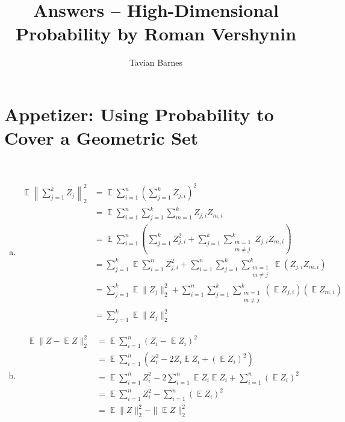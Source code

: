 \documentclass{report}
\title{Answers -- High-Dimensional Probability \linebreak[1] by Roman Vershynin}
\author{Tavian Barnes}
\date{}
\theoremstyle{definition}
\newenvironment{exercise}[1]{
  \renewcommand\theexerciseimpl{#1}
  \exerciseimpl
}{\endexerciseimpl}
\DeclareMathOperator{\E}{\mathbb{E}}
\begin{document}
\maketitle

\chapter*{Appetizer: Using Probability to Cover a Geometric Set}

\begin{exercise}{0.0.3}~
  \begin{enumerate}[(a)]
  \item
    \begin{align*}
      \E \left\| \sum_{j=1}^k Z_j \right\|_2^2 & = \E \sum_{i=1}^n \left(\sum_{j=1}^k Z_{j,i}\right)^2 \\
      & = \E \sum_{i=1}^n \sum_{j=1}^k \sum_{m=1}^k Z_{j,i} Z_{m,i} \\
      & = \E \sum_{i=1}^n \left(\sum_{j=1}^k Z_{j,i}^2 + \sum_{j=1}^k \sum_{\substack{m=1 \\ m \ne j}}^k Z_{j,i} Z_{m,i}\right) \\
      & = \sum_{j=1}^k \E \sum_{i=1}^n Z_{j,i}^2 + \sum_{i=1}^n \sum_{j=1}^k \sum_{\substack{m=1 \\ m \ne j}}^k \E (Z_{j,i} Z_{m,i}) \\
      & = \sum_{j=1}^k \E \|Z_j\|_2^2 + \sum_{i=1}^n \sum_{j=1}^k \sum_{\substack{m=1 \\ m \ne j}}^k (\E Z_{j,i}) (\E Z_{m,i}) \tag{by independence} \\
      & = \sum_{j=1}^k \E \|Z_j\|_2^2
    \end{align*}

  \item
    \begin{align*}
      \E \|Z - \E{Z}\|_2^2 & = \E \sum_{i=1}^n (Z_i - \E{Z_i})^2 \\
      & = \E \sum_{i=1}^n (Z_i^2 - 2 Z_i \E{Z_i} + (\E{Z_i})^2) \\
      & = \E \sum_{i=1}^n Z_i^2 - 2 \sum_{i=1}^n \E Z_i \E{Z_i} + \sum_{i=1}^n (\E Z_i)^2 \\
      & = \E \sum_{i=1}^n Z_i^2 -  \sum_{i=1}^n (\E Z_i)^2 \\
      & = \E \|Z\|_2^2 - \|\E Z\|_2^2
    \end{align*}
  \end{enumerate}
\end{exercise}

\begin{exercise}{0.0.5}
\end{exercise}
\end{document}
